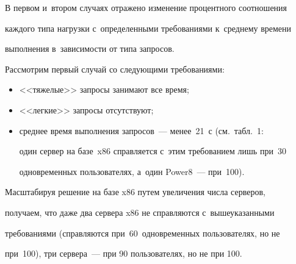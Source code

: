  

  В первом и~втором случаях отражено изменение процентного соотношения 

каждого типа нагрузки с~определенными требованиями к~среднему времени 

выполнения в~зависимости от типа запросов. 

  

  Рассмотрим первый случай со следующими требованиями:

  \begin{itemize}

\item <<тяжелые>> запросы занимают все время;\\[-13pt]

\item <<легкие>> запросы отсутствуют;

\item среднее время выполнения запросов~--- менее~21~с (см.\ табл.~1: 

один сервер на базе~x86 справляется с~этим требованием лишь при~30 

одновременных пользователях, а~один Power8~--- при~100).

\end{itemize}



 

  

  Масштабируя решение на базе x86 путем увеличения числа серверов, 

получаем, что даже два сервера x86 не справляются с~вышеуказанными 

требованиями (справляются при~60~одновременных пользователях, но не 

при~100), три сервера~--- при 90 пользователях, но не при 100. 

